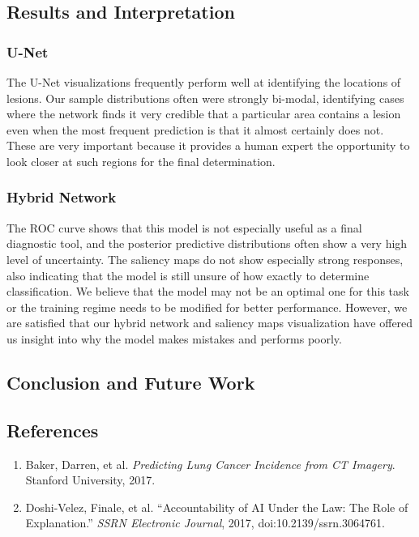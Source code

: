 \documentclass[12pt]{article}
\begin{document}
{\subsection*{Results and Interpretation}

\subsubsection*{U-Net}
The U-Net visualizations frequently perform well at identifying the locations of lesions. Our sample distributions often were strongly bi-modal, identifying cases where the network finds it very credible that a particular area contains a lesion even when the most frequent prediction is that it almost certainly does not. These are very important because it provides a human expert the opportunity to look closer at such regions for the final determination.

\subsubsection*{Hybrid Network}
The ROC curve shows that this model is not especially useful as a final diagnostic tool, and the posterior predictive distributions often show a very high level of uncertainty. The saliency maps do not show especially strong responses,  also indicating that the model is still unsure of how exactly to determine classification. We believe that the model may not be an optimal one for this task or the training regime needs to be modified for better performance. However, we are satisfied that our hybrid network and saliency maps visualization have offered us insight into why the model makes mistakes and performs poorly.

\subsection*{Conclusion and Future Work}


\pagebreak
\subsection*{References}

\begin{enumerate}
\item\label{bib:baker} Baker, Darren, et al. \textit{Predicting Lung Cancer Incidence from CT Imagery}. Stanford University, 2017.

\item\label{bib:finale} Doshi-Velez, Finale, et al. ``Accountability of AI Under the Law: The Role of Explanation.'' \textit{SSRN Electronic Journal}, 2017, doi:10.2139/ssrn.3064761.


\end{enumerate}}
\end{document}
